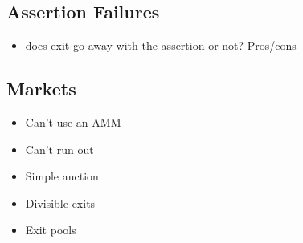 \subsection{Assertion Failures}

\begin{itemize}
\item does exit go away with the assertion or not? Pros/cons
\end{itemize}

\subsection{Markets}

\begin{itemize}
\item Can't use an AMM 
\item Can't run out
\item Simple auction
\item Divisible exits
\item Exit pools
\end{itemize}



